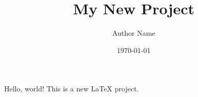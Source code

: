 \documentclass{article}
\title{My New Project}
\author{Author Name}
\date{\today}
\begin{document}
\maketitle

Hello, world! This is a new LaTeX project.
\end{document}
